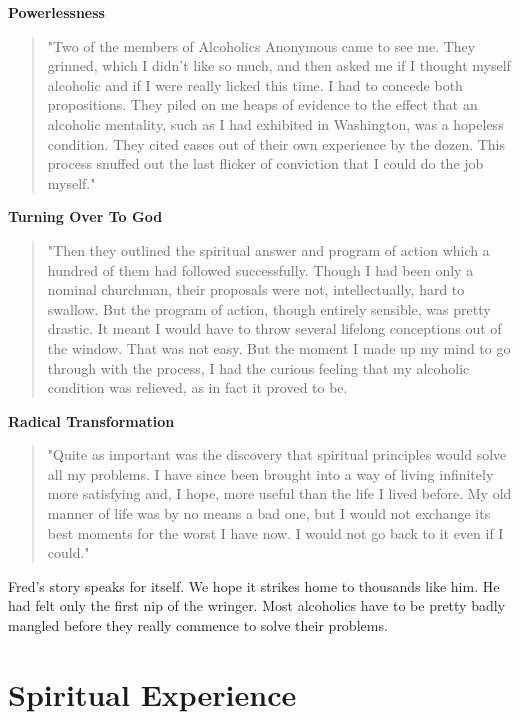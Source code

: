 \textbf{Powerlessness}

\begin{quote}
"Two of the members of Alcoholics Anonymous came to see me. 
They grinned, which I didn't like so much, 
and then asked me if I thought myself alcoholic and if I were really licked this time. 
I had to concede both propositions. 
They piled on me heaps of evidence to the effect that an alcoholic mentality, 
such as I had exhibited in Washington, was a hopeless condition. 
They cited cases out of their own experience by the dozen. 
This process snuffed out the last flicker of conviction that I could do the job myself."
\end{quote}

\textbf{Turning Over To God}

\begin{quote}
"Then they outlined the spiritual answer and program of action which a hundred of them had followed successfully. 
Though I had been only a nominal churchman, their proposals were not, intellectually, hard to swallow. 
But the program of action, though entirely sensible, was pretty drastic. 
It meant I would have to throw several lifelong conceptions out of the window. 
That was not easy. 
But the moment I made up my mind to go through with the process, 
I had the curious feeling that my alcoholic condition was relieved, 
as in fact it proved to be.
\end{quote}

\textbf{Radical Transformation}

\begin{quote}
"Quite as important was the discovery that spiritual principles would solve all my problems. 
I have since been brought into a way of living infinitely more satisfying and, 
I hope, more useful than the life I lived before. 
My old manner of life was by no means a bad one, 
but I would not exchange its best moments for the worst I have now. 
I would not go back to it even if I could."
\end{quote}
Fred's story speaks for itself. 
We hope it strikes home to thousands like him. 
He had felt only the first nip of the wringer. 
Most alcoholics have to be pretty badly mangled before they really commence to solve their problems.


\section{Spiritual Experience}

